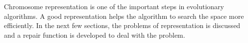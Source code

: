 \documentclass{article}
\begin{document}
Chromosome representation is one of the important steps in evolutionary algorithms. 
A good representation helps the algorithm to search the space more efficiently. 
In the next few sections, the problems of representation is discussed and a repair function is developed to deal with the problem.
%
%
%    
\end{document}
